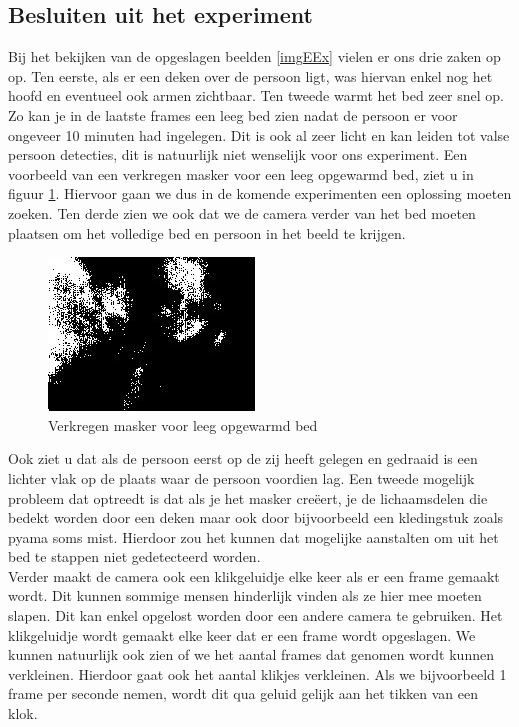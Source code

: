 \subsection{Besluiten uit het experiment}
\label{ERefOBB}
 Bij het bekijken van de opgeslagen beelden \ref{imgEEx} vielen er ons drie zaken op op. Ten eerste, als er een deken over de persoon ligt, was hiervan enkel nog het hoofd en eventueel ook armen zichtbaar. Ten tweede warmt het bed zeer snel op. Zo kan je in de laatste frames een leeg bed zien nadat de persoon er voor ongeveer 10 minuten had ingelegen. Dit is ook al zeer licht en kan leiden tot valse persoon detecties, dit is natuurlijk niet wenselijk voor ons experiment. Een voorbeeld van een verkregen masker voor een leeg opgewarmd bed, ziet u in figuur \ref{imgCOB}.  Hiervoor gaan we dus in de komende experimenten een oplossing moeten zoeken. Ten derde zien we ook dat we de camera verder van het bed moeten plaatsen om het volledige bed en persoon in het beeld te krijgen.
\begin{figure}[hbp]
	\includegraphics[scale = 0.75]{EersteExperiment_mask10}
	\caption{Verkregen masker voor leeg opgewarmd bed}
	\label{imgCOB}
\end{figure}
Ook ziet u dat als de persoon eerst op de zij heeft gelegen en gedraaid is een lichter vlak op de plaats waar de persoon voordien lag.
Een tweede mogelijk probleem dat optreedt is dat als je het masker cre\"eert, je de lichaamsdelen die bedekt worden door een deken maar ook door bijvoorbeeld een kledingstuk zoals pyama soms mist. Hierdoor zou het kunnen dat mogelijke aanstalten om uit het bed te stappen niet gedetecteerd worden. \\
Verder maakt de camera ook een klikgeluidje elke keer als er een frame gemaakt wordt. Dit kunnen sommige mensen hinderlijk vinden als ze hier mee moeten slapen. Dit kan enkel opgelost worden door een andere camera te gebruiken. Het klikgeluidje wordt gemaakt elke keer dat er een frame wordt opgeslagen. We kunnen natuurlijk ook zien of we het aantal frames dat genomen wordt kunnen verkleinen. Hierdoor gaat ook het aantal klikjes verkleinen. Als we bijvoorbeeld 1 frame per seconde nemen, wordt dit qua geluid gelijk aan het tikken van een klok.


